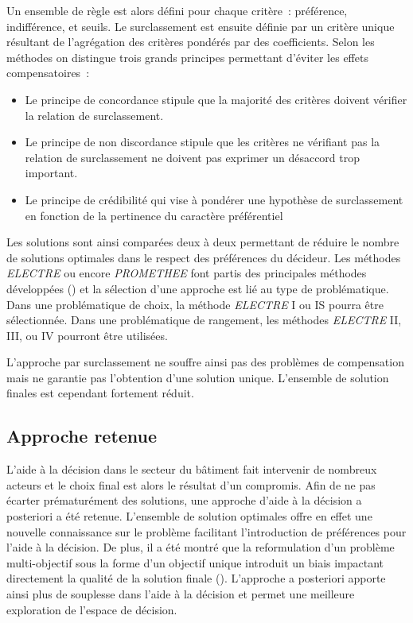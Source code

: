 Un ensemble de règle est alors défini pour chaque critère~: préférence, indifférence,
et seuils. Le surclassement est ensuite définie par un critère unique résultant de
l’agrégation des critères pondérés par des coefficients. Selon les méthodes on distingue
trois grands principes permettant d’éviter les effets compensatoires~:
\begin{itemize}
  \item Le principe de concordance stipule que la majorité des critères doivent
        vérifier la relation de surclassement.
  \item Le principe de non discordance stipule que les critères ne vérifiant pas
        la relation de surclassement ne doivent pas exprimer un désaccord trop
        important.
  \item Le principe de crédibilité qui vise à pondérer une hypothèse de surclassement
        en fonction de la pertinence du caractère préférentiel
\end{itemize}
Les solutions sont ainsi comparées deux à deux permettant de réduire le nombre
de solutions optimales dans le respect des préférences du décideur. Les méthodes
\textit{ELECTRE} ou encore \textit{PROMETHEE} font partis des principales méthodes développées
() et la sélection d’une approche est lié au type de
problématique. Dans une problématique de choix, la méthode \textit{ELECTRE} I
ou IS pourra être sélectionnée. Dans une problématique de rangement, les méthodes
\textit{ELECTRE} II, III, ou IV pourront être utilisées.


L’approche par surclassement ne souffre ainsi pas des problèmes de compensation
mais ne garantie pas l’obtention d’une solution unique. L’ensemble de solution
finales est cependant fortement réduit.


\subsection{Approche retenue} %
\label{sub:approche_retenue}
L’aide à la décision dans le secteur du bâtiment fait intervenir de nombreux acteurs
et le choix final est alors le résultat d’un compromis. Afin de ne pas écarter prématurément
des solutions, une approche d’aide à la décision a posteriori a été retenue. L’ensemble
de solution optimales offre en effet une nouvelle connaissance sur le problème
facilitant l’introduction de préférences pour l’aide à la décision.
De plus, il a été montré que la reformulation d’un problème multi-objectif sous la
forme d’un objectif unique introduit un biais impactant directement la qualité de
la solution finale (). L’approche a posteriori
apporte ainsi plus de souplesse dans l’aide à la décision et permet une meilleure
exploration de l’espace de décision.

